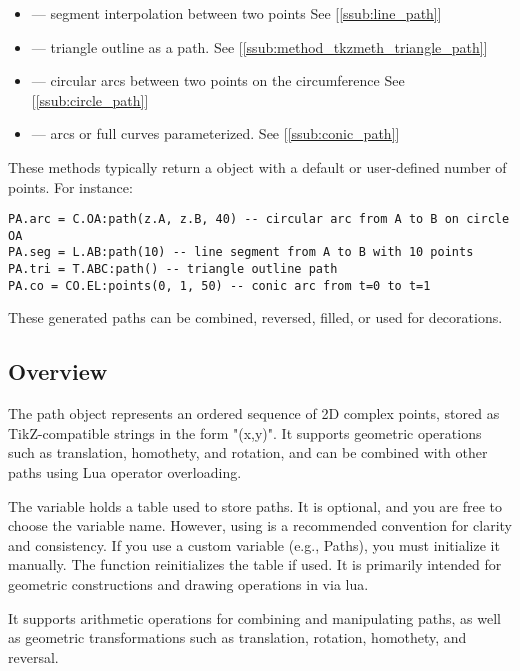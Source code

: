 {\begin{itemize}
\item {} — segment interpolation between two points See [\ref{ssub:line_path}]
\item {} — triangle outline as a path. See [\ref{ssub:method_tkzmeth_triangle_path}]
\item {} — circular arcs between two points on the circumference See [\ref{ssub:circle_path}]
\item {} — arcs or full curves parameterized. See [\ref{ssub:conic_path}]
\end{itemize}

These methods typically return a  object with a default or user-defined number of points. For instance:

\begin{verbatim}
PA.arc = C.OA:path(z.A, z.B, 40) -- circular arc from A to B on circle OA
PA.seg = L.AB:path(10) -- line segment from A to B with 10 points
PA.tri = T.ABC:path() -- triangle outline path
PA.co = CO.EL:points(0, 1, 50) -- conic arc from t=0 to t=1
\end{verbatim}

These generated paths can be combined, reversed, filled, or used for \TIKZ{} decorations.


\subsection{Overview} %
\label{sub:Overview}

The path object represents an ordered sequence of 2D complex points, stored as TikZ-compatible strings in the form "(x,y)". It supports geometric operations such as translation, homothety, and rotation, and can be combined with other paths using Lua operator overloading.

The variable  holds a table used to store paths. It is optional, and you are free to choose the variable name. However, using  is a recommended convention for clarity and consistency. If you use a custom variable (e.g., Paths), you must initialize it manually. The  function reinitializes the  table if used.
 It is primarily intended for geometric constructions and drawing operations in \TIKZ{} via lua\LATEX{}.

It supports arithmetic operations for combining and manipulating paths, as well as geometric transformations such as translation, rotation, homothety, and reversal.

}
